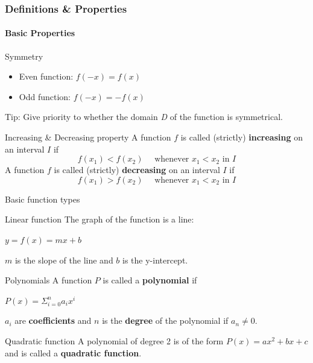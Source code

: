 \documentclass{beamer}
\begin{document}
\begin{frame}
\frametitle{Definitions \& Properties}
\framesubtitle{Basic Properties}
    \begin{block}{Symmetry}
        \begin{itemize}
            \item Even function: $f(-x)=f(x)$
            \item Odd function: $f(-x)=-f(x)$
        \end{itemize}
Tip: Give priority to whether the domain \textit{D} of the function is symmetrical.
    \end{block}
    \begin{block}{Increasing \& Decreasing property}
    A function $f$ is called (strictly) \textbf{increasing} on an interval $I$ if
$$
f\left(x_{1}\right)<f\left(x_{2}\right) \quad \text { whenever } x_{1}<x_{2} \text { in } I
$$
A function $f$ is called (strictly) \textbf{decreasing} on an interval $I$ if
$$
f\left(x_{1}\right)>f\left(x_{2}\right) \quad \text { whenever } x_{1}<x_{2} \text { in } I
$$
    \end{block}
\end{frame}
\begin{frame}{Basic function types}
    \begin{block}{Linear function}
        The graph of the function is a line:
        \begin{center}
            $y=f(x)=mx+b$
        \end{center}
       $m$ is the slope of the line and $b$ is the y-intercept.
    \end{block}

    \begin{block}{Polynomials}
        A function $P$ is called a \textbf{polynomial} if
        \begin{center}
            $P(x)=\Sigma_{i=0}^n a_ix^i$
        \end{center}
       $a_i$ are \textbf{coefficients} and $n$ is the \textbf{degree} of the polynomial if $a_n\neq0$.
    \end{block}
    \begin{block}{Quadratic function}
        A polynomial of degree 2 is of the form $P(x)=ax^2+bx+c$ and is called a \textbf{quadratic function}.
    \end{block}
    
\end{frame}
\end{document}
